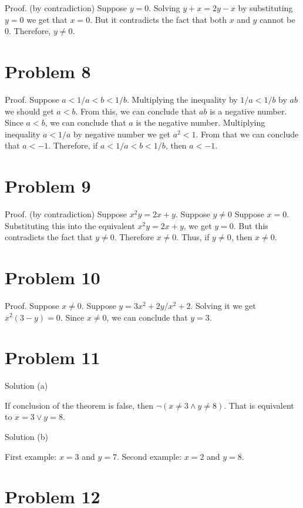 \documentclass{article}
\begin{document}
Proof. (by contradiction) Suppose $y = 0$. Solving $y +
x = 2y - x$ by substituting $y=0$ we get that $x=0$. But it
contradicts the fact that both $x$ and $y$ cannot be $0$. Therefore,
$y \neq 0$.

\section{Problem 8}

Proof. Suppose $a < 1/a < b < 1/b$. Multiplying  the inequality by
$1/a < 1/b$ by $ab$ we should get $a < b$. From this, we can conclude
that $ab$ is a negative number. Since $a < b$, we can conclude that
$a$ is the negative number. Multiplying inequality $a < 1/a$ by
negative number we get $a^2 < 1$. From that we can conclude that $a <
-1$. Therefore, if $a < 1/a < b < 1/b$, then $a < -1$.

\section{Problem 9}

Proof. (by contradiction) Suppose $x^2y = 2x + y$. Suppose $y \neq 0$ Suppose $x = 0$.
Substituting this into the equivalent $x^2y = 2x + y$, we get $y = 0$.
But this contradicts the fact that $y \neq 0$. Therefore $x \neq 0$.
Thus, if $y \neq 0$, then $x \neq 0$.

\section{Problem 10}

Proof. Suppose $x \neq 0$. Suppose $y = 3x^2 + 2y / x^2 + 2$. Solving
it we get $x^2(3 - y) = 0$. Since $x \neq 0$, we can conclude that $y
= 3$.

\section{Problem 11}

Solution (a)

If conclusion of the theorem is false, then $\neg( x \neq 3 \land y
\neq 8)$. That is equivalent to $x = 3 \lor y = 8$.

Solution (b)

First example: $x = 3$ and $y = 7$.
Second example: $x = 2$ and $y = 8$.

\section{Problem 12}
\end{document}
